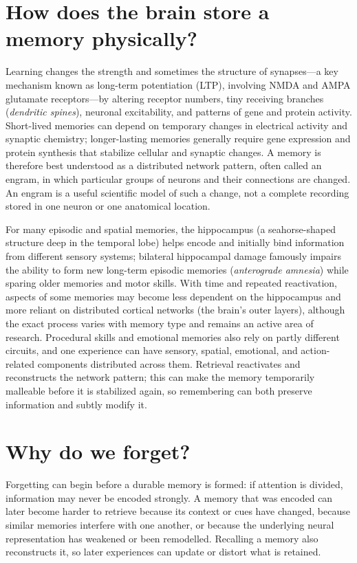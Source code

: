 \documentclass[11pt,oneside]{report}
\begin{document}
\section{How does the brain store a memory physically?}

Learning changes the strength and sometimes the structure of synapses—a key
mechanism known as long-term potentiation (LTP), involving NMDA and AMPA
glutamate receptors—by altering receptor numbers, tiny receiving branches
(\emph{dendritic spines}), neuronal excitability, and patterns of gene and
protein activity. Short-lived memories
can depend on temporary changes in electrical activity and synaptic chemistry;
longer-lasting memories generally require gene expression and protein synthesis
that stabilize cellular and synaptic changes. A memory is therefore best
understood as a distributed network pattern, often called an engram, in which
particular groups of neurons and their connections are changed. An engram is a
useful scientific model of such a change, not a complete recording stored in
one neuron or one anatomical location.

For many episodic and spatial memories, the hippocampus (a seahorse-shaped
structure deep in the temporal lobe) helps encode and initially bind information
from different sensory systems; bilateral hippocampal damage famously impairs
the ability to form new long-term episodic memories (\emph{anterograde amnesia})
while sparing older memories and motor skills. With time and repeated
reactivation, aspects of some memories may become less dependent on the
hippocampus and more reliant on distributed cortical networks (the brain's outer
layers), although the exact process varies with memory type and remains an
active area of research.
Procedural skills and emotional memories also rely on partly different circuits,
and one experience can have sensory, spatial, emotional, and action-related
components distributed across them. Retrieval reactivates and reconstructs the
network pattern; this can make the memory temporarily malleable before it is
stabilized again, so remembering can
both preserve information and subtly modify it.

\section{Why do we forget?}

Forgetting can begin before a durable memory is formed: if attention is
divided, information may never be encoded strongly. A memory that was encoded
can later become harder to retrieve because its context or cues have changed,
because similar memories interfere with one another, or because the underlying
neural representation has weakened or been remodelled. Recalling a memory also
reconstructs it, so later experiences can update or distort what is retained.
\end{document}
